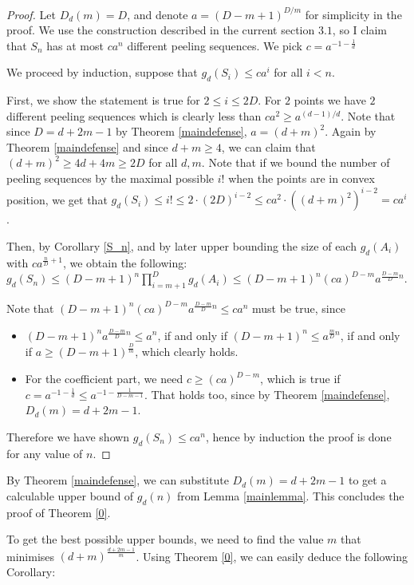 \documentclass[a4paper,UKenglish,cleveref, autoref, thm-restate]{lipics-v2021}
\begin{document}
\begin{proof}
Let $D_d(m)=D$, and denote $a=(D-m+1)^{D/m}$ for simplicity in the proof. We use the construction described in the current section $3.1$, so I claim that $S_n$ has at most $ca^n$ different peeling sequences. We pick $c=a^{-1-\frac1d}$

 We proceed by induction, suppose that $g_d(S_i)\leq ca^i$ for all $i<n$. 

 First, we show the statement is true for $2\leq i\leq 2D$. For $2$ points we have $2$ different peeling sequences which is clearly less than $ca^2\geq a^{(d-1)/d}$. Note that since $D=d+2m-1$ by Theorem \ref{maindefense}, $a= (d+m)^2$. Again by Theorem \ref{maindefense} and since $d+m\geq4$, we can claim that $(d+m)^2\geq 4d+4m\geq2D$ for all $d,m$. Note that if we bound the number of peeling sequences by the maximal possible $i!$ when the points are in convex position, we get that $g_d(S_i)\leq i!\leq 2\cdot (2D)^{i-2}\leq ca^2\cdot ((d+m)^2)^{i-2}=ca^{i}$.

 Then, by Corollary \ref{S_n}, and by later upper bounding the size of each $g_d(A_i)$ with $ca^{\frac{n}{D}+1}$, we obtain the following: \newline
$g_d(S_n)\leq (D-m+1)^n\prod_{i=m+1}^{D}g_d(A_i) \leq (D-m+1)^n(ca)^{D-m}a^{\frac{D-m}{D}n}$.

 Note that $(D-m+1)^n(ca)^{D-m}a^{\frac{D-m}{D}n}\leq ca^n$ must be true, since
\begin{itemize}
    \item $(D-m+1)^na^{\frac{D-m}{D}n}\leq a^n$, if and only if $(D-m+1)^n\leq a^{\frac{m}{D}n}$, if and only if $a\geq (D-m+1)^{\frac{D}{m}}$, which clearly holds.
    \item For the coefficient part, we need $c\geq (ca)^{D-m}$, which is true if $c=a^{-1-\frac1d}\leq a^{-1-\frac{1}{D-m-1}}$. That holds too, since by Theorem \ref{maindefense}, $D_d(m)=d+2m-1$.
\end{itemize}

 Therefore we have shown $g_d(S_n)\leq ca^n$, hence by induction the proof is done for any value of $n$.
\end{proof}

 By Theorem \ref{maindefense}, we can substitute $D_d(m)= d+2m-1$ to get a calculable upper bound of $g_d(n)$ from Lemma \ref{mainlemma}. This concludes the proof of Theorem \ref{0}.

 To get the best possible upper bounds, we need to find the value $m$ that minimises $(d+m)^{\frac{d+2m-1}{m}}$. 
Using Theorem \ref{0}, we can easily deduce the following Corollary:
\end{document}
